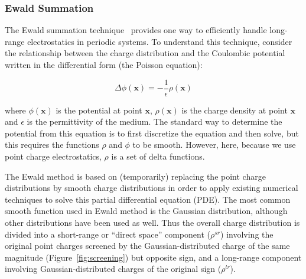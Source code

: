 \documentclass[9pt,bestpractices]{livecoms}
\begin{document}
\subsubsection{ Ewald Summation}

The Ewald summation technique~\cite{Ewald_1921} provides one way to efficiently handle long-range electrostatics in periodic systems.
To understand this technique, consider the relationship between the charge distribution and the Coulombic potential written in the differential form (the Poisson equation):

\[
\Delta \phi(\boldsymbol{x}) = - \frac{1}{\epsilon} \rho(\boldsymbol{x}) 
\] 

where  $\phi(\boldsymbol{x})$ is the potential at point $\boldsymbol{x}$, $\rho(\boldsymbol{x})$ is the charge density at point $\boldsymbol{x}$ and $\epsilon$ is the permittivity of the medium. 
The standard way to determine the potential from this equation is to first discretize the equation and then solve, but this requires the functions  $\rho$ and $\phi$ to be smooth.
However, here, because we use point charge electrostatics, $\rho$ is a set of delta functions.
   
The Ewald method is based on (temporarily) replacing the point charge distributions by smooth charge distributions in order to apply existing numerical techniques to solve this partial differential equation (PDE).
The most common smooth function used in Ewald method is the Gaussian distribution, although other distributions have been used as well.
Thus the overall charge distribution is divided into a short-range or ``direct space'' component ($\rho^{sr}$) involving the original point charges screened by the Gaussian-distributed charge of the same magnitude (Figure~\ref{fig:screening}) but opposite sign, and a long-range component involving Gaussian-distributed charges of the original sign ($\rho^{lr}$).
\end{document}

